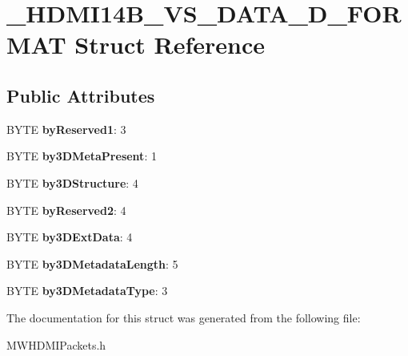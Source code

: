 \hypertarget{struct__HDMI14B__VS__DATA__3D__FORMAT}{\section{\-\_\-\-H\-D\-M\-I14\-B\-\_\-\-V\-S\-\_\-\-D\-A\-T\-A\-\_\-D\-\_\-\-F\-O\-R\-M\-A\-T Struct Reference}
\label{struct__HDMI14B__VS__DATA__3D__FORMAT}
}
\subsection*{Public Attributes}
\begin{DoxyCompactItemize}
\item 
\hypertarget{struct__HDMI14B__VS__DATA__3D__FORMAT_ab269f8e14fc4cf0b99ab2a129d953caf}{B\-Y\-T\-E {\bfseries by\-Reserved1}\-: 3}\label{struct__HDMI14B__VS__DATA__3D__FORMAT_ab269f8e14fc4cf0b99ab2a129d953caf}

\item 
\hypertarget{struct__HDMI14B__VS__DATA__3D__FORMAT_ad2a1057e0a5eca521597d28ec9675063}{B\-Y\-T\-E {\bfseries by3\-D\-Meta\-Present}\-: 1}\label{struct__HDMI14B__VS__DATA__3D__FORMAT_ad2a1057e0a5eca521597d28ec9675063}

\item 
\hypertarget{struct__HDMI14B__VS__DATA__3D__FORMAT_ae69c2f3400fb071df375d6fbb44baa7f}{B\-Y\-T\-E {\bfseries by3\-D\-Structure}\-: 4}\label{struct__HDMI14B__VS__DATA__3D__FORMAT_ae69c2f3400fb071df375d6fbb44baa7f}

\item 
\hypertarget{struct__HDMI14B__VS__DATA__3D__FORMAT_adb51bc892986d0f9ac89fb6259803def}{B\-Y\-T\-E {\bfseries by\-Reserved2}\-: 4}\label{struct__HDMI14B__VS__DATA__3D__FORMAT_adb51bc892986d0f9ac89fb6259803def}

\item 
\hypertarget{struct__HDMI14B__VS__DATA__3D__FORMAT_a286a55b96ec0ac0d19675b27e4081d6c}{B\-Y\-T\-E {\bfseries by3\-D\-Ext\-Data}\-: 4}\label{struct__HDMI14B__VS__DATA__3D__FORMAT_a286a55b96ec0ac0d19675b27e4081d6c}

\item 
\hypertarget{struct__HDMI14B__VS__DATA__3D__FORMAT_ae8504de5295524ee40e201a960e23ef4}{B\-Y\-T\-E {\bfseries by3\-D\-Metadata\-Length}\-: 5}\label{struct__HDMI14B__VS__DATA__3D__FORMAT_ae8504de5295524ee40e201a960e23ef4}

\item 
\hypertarget{struct__HDMI14B__VS__DATA__3D__FORMAT_a908083090bd8b0e6e98e035f8a87bfd6}{B\-Y\-T\-E {\bfseries by3\-D\-Metadata\-Type}\-: 3}\label{struct__HDMI14B__VS__DATA__3D__FORMAT_a908083090bd8b0e6e98e035f8a87bfd6}

\end{DoxyCompactItemize}


The documentation for this struct was generated from the following file\-:\begin{DoxyCompactItemize}
\item 
M\-W\-H\-D\-M\-I\-Packets.\-h\end{DoxyCompactItemize}
